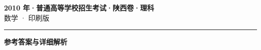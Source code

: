 \documentclass[zihao=5, a4paper]{ctexart}
\begin{document}
\begin{center}
  {\Large\bfseries 2010 年·普通高等学校招生考试·陕西卷·理科}\\[4pt]
  {\large 数学 · 印刷版}
\end{center}
\medskip
{}

\par\bigskip\hrule\bigskip
{}
\begin{center}{\large\bfseries 参考答案与详细解析}\end{center}
\smallskip

\end{document}
